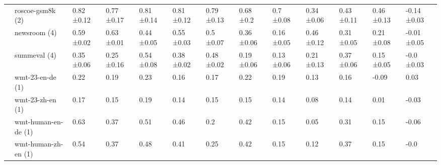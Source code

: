 \begin{tabular}{lllllllllllll}
 & \cellcolor{red!25}roscoe-gsm8k (2) & 0.82 ±0.12 & 0.77 ±0.17 & 0.81 ±0.14 & 0.81 ±0.12 & 0.79 ±0.13 & 0.68 ±0.2 & 0.7 ±0.08 & 0.34 ±0.06 & 0.43 ±0.11 & 0.46 ±0.13 & -0.14 ±0.03 \\
 & \cellcolor{red!25}newsroom (4) & 0.59 ±0.02 & 0.63 ±0.01 & 0.44 ±0.05 & 0.55 ±0.03 & 0.5 ±0.07 & 0.36 ±0.06 & 0.16 ±0.05 & 0.46 ±0.12 & 0.31 ±0.05 & 0.21 ±0.08 & -0.01 ±0.05 \\
 & \cellcolor{red!25}summeval (4) & 0.35 ±0.06 & 0.25 ±0.16 & 0.54 ±0.08 & 0.38 ±0.02 & 0.48 ±0.02 & 0.19 ±0.06 & 0.13 ±0.06 & 0.21 ±0.13 & 0.37 ±0.06 & 0.15 ±0.05 & -0.0 ±0.03 \\
 & \cellcolor{red!25}wmt-23-en-de (1) & 0.22  & 0.19  & 0.23  & 0.16  & 0.17  & 0.22  & 0.19  & 0.13  & 0.16  & -0.09  & 0.03  \\
 & \cellcolor{red!25}wmt-23-zh-en (1) & 0.17  & 0.15  & 0.19  & 0.14  & 0.15  & 0.15  & 0.14  & 0.08  & 0.14  & 0.01  & -0.03  \\
 & \cellcolor{red!25}wmt-human-en-de (1) & 0.63  & 0.37  & 0.51  & 0.46  & 0.2  & 0.42  & 0.15  & 0.05  & 0.31  & 0.15  & -0.06  \\
 & \cellcolor{red!25}wmt-human-zh-en (1) & 0.54  & 0.37  & 0.48  & 0.41  & 0.25  & 0.42  & 0.15  & 0.12  & 0.37  & 0.15  & -0.0  \\
\bottomrule
\end{tabular}

